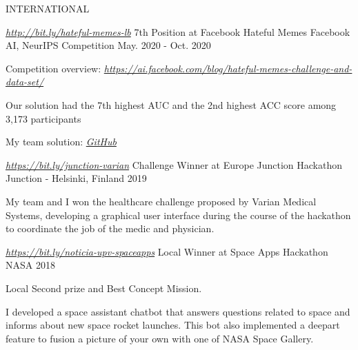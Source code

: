 \vspace{5mm} 
\newline
INTERNATIONAL
\begin{cventries}
    \cventry
        {\href{http://bit.ly/hateful-memes-lb}{\textit{http://bit.ly/hateful-memes-lb}}} %
        {7th Position at Facebook Hateful Memes} %
        {Facebook AI, NeurIPS Competition} %
        {May. 2020 - Oct. 2020} %
        {\begin{cvitems} %
        \item {Competition overview:  \href{https://ai.facebook.com/blog/hateful-memes-challenge-and-data-set/}{\textit{https://ai.facebook.com/blog/hateful-memes-challenge-and-data-set/}} }
        \item {Our solution had the 7th highest AUC and the 2nd highest ACC score among 3,173 participants}
        \item {My team solution: \href{https://github.com/VictorCallejas/FB_MMHM}{\textit{GitHub}}}
        \end{cvitems}}
    \cventry
        {\href{https://bit.ly/junction-varian}{\textit{https://bit.ly/junction-varian}}} %
        {Challenge Winner at Europe Junction Hackathon} %
        {Junction - Helsinki, Finland} %
        {2019} %
        {\begin{cvitems} %
        \item {My team and I won the healthcare challenge proposed by Varian Medical Systems, developing a graphical user interface during the course of the hackathon to coordinate the job of the medic and physician.}
    \end{cvitems} }
     \cventry
        {\href{https://bit.ly/noticia-upv-spaceapps}{\textit{https://bit.ly/noticia-upv-spaceapps}}} %
        {Local Winner at Space Apps Hackathon} %
        {NASA} %
        {2018} %
        {\begin{cvitems}
        \item Local Second prize and Best Concept Mission.	
    	\item I developed a space assistant chatbot that answers questions related to space and informs about new space rocket launches. This bot also implemented a deepart feature to fusion a picture of your own with one of NASA Space Gallery.
    	\end{cvitems}}

\end{cventries}

